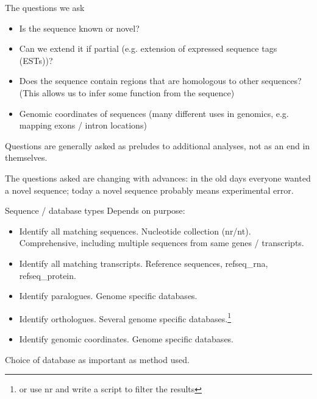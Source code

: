 \documentclass[pdf]{beamer}
\begin{document}
\begin{frame}{The questions we ask}
  \begin{itemize}
  \item Is the sequence known or novel?
  \item Can we extend it if partial (e.g. extension of expressed sequence tags
    (ESTs))?
  \item Does the sequence contain regions that are homologous to other
    sequences? (This allows us to infer some function from the sequence)
  \item Genomic coordinates of sequences (many different uses in genomics,
    e.g. mapping exons / intron locations)
  \end{itemize}
  Questions are generally asked as preludes to additional analyses, not as an
  end in themselves.

  The questions asked are changing with advances: in the old days everyone
  wanted a novel sequence; today a novel sequence probably means experimental
  error.
\end{frame}

\begin{frame}{Sequence / database types}
  Depends on purpose:
  \begin{itemize}
  \item Identify all matching sequences. Nucleotide collection (nr/nt).
    Comprehensive, including multiple sequences from same genes / transcripts.
  \item Identify all matching transcripts. Reference sequences, refseq\_rna, refseq\_protein.
  \item Identify paralogues. Genome specific databases.
  \item Identify orthologues. Several genome specific databases.\footnote{or use nr and write
      a script to filter the results}
  \item Identify genomic coordinates. Genome specific databases.
  \end{itemize}
  
  Choice of database as important as method used. 
\end{frame}
\end{document}

